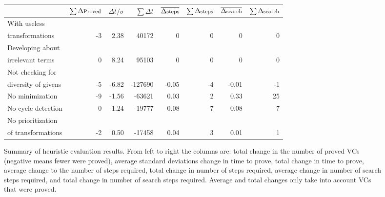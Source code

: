 \setlength{\tabcolsep}{7pt}
\begin{figure}
	\centering
	\begin{tabular}{lrrrrrrr}
		\toprule
			& $\sum \Delta\text{\footnotesize Proved}$	& $\overline{\Delta t / \sigma}$	& $\sum\Delta t$ & $\overline{\Delta\text{\footnotesize steps}}$ & $\sum\Delta\text{\footnotesize steps}$ & $\overline{\Delta\text{\footnotesize search}}$ & $\sum\Delta\text{\footnotesize search}$ \\
		\midrule
		\footnotesize With useless \\
		\footnotesize transformations		& -3	& 2.38	& 40172		& 0	& 0	& 0	& 0	\\
		\midrule
		\footnotesize Developing about \\
		\footnotesize irrelevant terms		& 0	& 8.24	& 95103		& 0	& 0	& 0	& 0\\
		\midrule
		\footnotesize Not checking for \\
		\footnotesize diversity of givens	& -5	& -6.82	& -127690	& -0.05	& -4	& -0.01 & -1	\\
		\midrule
		\footnotesize No minimization		& -9	& -1.56	& -63621	& 0.03	& 2	& 0.33	& 25	\\
		\midrule
		\footnotesize No cycle detection	& 0	& -1.24	& -19777	& 0.08	& 7	& 0.08	& 7	\\
		\midrule
		\footnotesize No prioritization \\
		\footnotesize of transformations	& -2	& 0.50	& -17458	& 0.04	& 3	& 0.01	& 1	\\
		\bottomrule
	\end{tabular}
	\caption{Summary of heuristic evaluation results.  From left to right the columns are: total change in the number of proved VCs (negative means fewer were proved), average standard deviations change in time to prove, total change in time to prove, average change to the number of steps required, total change in number of steps required, average change in number of search steps required, and total change in number of search steps required.  Average and total changes only take into account VCs that were proved.\label{heuristicEvalTable}}
\end{figure}
\setlength{\tabcolsep}{6pt}

